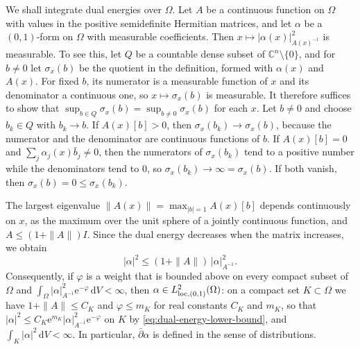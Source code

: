 We shall integrate dual energies over $\Omega$. Let $A$ be a continuous function on $\Omega$ with values in the positive semidefinite Hermitian matrices, and let $\alpha$ be a $(0,1)$-form on $\Omega$ with measurable coefficients. Then $x\mapsto|\alpha(x)|_{A(x)^{-1}}^2$ is measurable. To see this, let $Q$ be a countable dense subset of $\mathbb C^n\setminus\{0\}$, and for $b\ne0$ let $\sigma_x(b)$ be the quotient in the definition, formed with $\alpha(x)$ and $A(x)$. For fixed $b$, its numerator is a measurable function of $x$ and its denominator a continuous one, so $x\mapsto\sigma_x(b)$ is measurable. It therefore suffices to show that $\sup_{b\in Q}\sigma_x(b)=\sup_{b\ne0}\sigma_x(b)$ for each $x$. Let $b\ne0$ and choose $b_k\in Q$ with $b_k\to b$. If $A(x)[b]>0$, then $\sigma_x(b_k)\to\sigma_x(b)$, because the numerator and the denominator are continuous functions of $b$. If $A(x)[b]=0$ and $\sum_j\alpha_j(x)\bar b_j\ne0$, then the numerators of $\sigma_x(b_k)$ tend to a positive number while the denominators tend to $0$, so $\sigma_x(b_k)\to\infty=\sigma_x(b)$. If both vanish, then $\sigma_x(b)=0\le\sigma_x(b_k)$.

The largest eigenvalue $\|A(x)\|=\max_{|b|=1}A(x)[b]$ depends continuously on $x$, as the maximum over the unit sphere of a jointly continuous function, and $A\le(1+\|A\|)I$. Since the dual energy decreases when the matrix increases, we obtain
\begin{equation}\label{eq:dual-energy-lower-bound}
 |\alpha|^2\le(1+\|A\|)\,|\alpha|_{A^{-1}}^2.
\end{equation}
Consequently, if $\varphi$ is a weight that is bounded above on every compact subset of $\Omega$ and $\int_\Omega|\alpha|_{A^{-1}}^2\mathrm e^{-\varphi}\,\mathrm dV<\infty$, then $\alpha\in L^2_{\mathrm{loc},(0,1)}(\Omega)$: on a compact set $K\subset\Omega$ we have $1+\|A\|\le C_K$ and $\varphi\le m_K$ for real constants $C_K$ and $m_K$, so that $|\alpha|^2\le C_K\mathrm e^{m_K}|\alpha|_{A^{-1}}^2\mathrm e^{-\varphi}$ on $K$ by \eqref{eq:dual-energy-lower-bound}, and $\int_K|\alpha|^2\,\mathrm dV<\infty$. In particular, $\bar\partial\alpha$ is defined in the sense of distributions.

